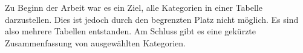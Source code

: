 \begin{itemize}
    Zu Beginn der Arbeit war es ein Ziel, alle Kategorien in einer Tabelle darzustellen.
    Dies ist jedoch durch den begrenzten Platz nicht möglich. Es sind also mehrere
    Tabellen entstanden. Am Schluss gibt es eine gekürzte Zusammenfassung von ausgewählten
    Kategorien.


    
    
    
    
    
    
    

\end{itemize}


